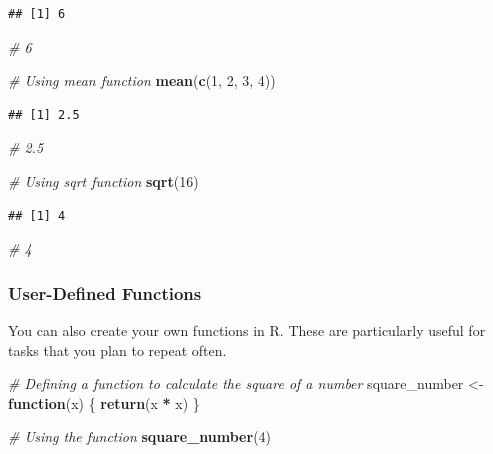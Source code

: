 \documentclass[
  b5paper]{book}
\newenvironment{Shaded}{\begin{snugshade}}{\end{snugshade}}
\newcommand{\CommentTok}[1]{\textcolor[rgb]{0.56,0.35,0.01}{\textit{#1}}}
\newcommand{\ControlFlowTok}[1]{\textcolor[rgb]{0.13,0.29,0.53}{\textbf{#1}}}
\newcommand{\DecValTok}[1]{\textcolor[rgb]{0.00,0.00,0.81}{#1}}
\newcommand{\FunctionTok}[1]{\textcolor[rgb]{0.13,0.29,0.53}{\textbf{#1}}}
\newcommand{\NormalTok}[1]{#1}
\newcommand{\OtherTok}[1]{\textcolor[rgb]{0.56,0.35,0.01}{#1}}
\newcommand{\SpecialCharTok}[1]{\textcolor[rgb]{0.81,0.36,0.00}{\textbf{#1}}}
\begin{document}
\begin{verbatim}
## [1] 6
\end{verbatim}

\begin{Shaded}
\begin{Highlighting}[]
\CommentTok{\# 6}

\CommentTok{\# Using mean function}
\FunctionTok{mean}\NormalTok{(}\FunctionTok{c}\NormalTok{(}\DecValTok{1}\NormalTok{, }\DecValTok{2}\NormalTok{, }\DecValTok{3}\NormalTok{, }\DecValTok{4}\NormalTok{))}
\end{Highlighting}
\end{Shaded}

\begin{verbatim}
## [1] 2.5
\end{verbatim}

\begin{Shaded}
\begin{Highlighting}[]
\CommentTok{\# 2.5}

\CommentTok{\# Using sqrt function}
\FunctionTok{sqrt}\NormalTok{(}\DecValTok{16}\NormalTok{)}
\end{Highlighting}
\end{Shaded}

\begin{verbatim}
## [1] 4
\end{verbatim}

\begin{Shaded}
\begin{Highlighting}[]
\CommentTok{\# 4}
\end{Highlighting}
\end{Shaded}

\hypertarget{user-defined-functions}{%
\subsubsection*{User-Defined Functions}\label{user-defined-functions}}

You can also create your own functions in R. These are particularly useful for tasks that you plan to repeat often.

\begin{Shaded}
\begin{Highlighting}[]
\CommentTok{\# Defining a function to calculate the square of a number}
\NormalTok{square\_number }\OtherTok{\textless{}{-}} \ControlFlowTok{function}\NormalTok{(x) \{}
  \FunctionTok{return}\NormalTok{(x }\SpecialCharTok{*}\NormalTok{ x)}
\NormalTok{\}}

\CommentTok{\# Using the function}
\FunctionTok{square\_number}\NormalTok{(}\DecValTok{4}\NormalTok{)}
\end{Highlighting}
\end{Shaded}
\end{document}
